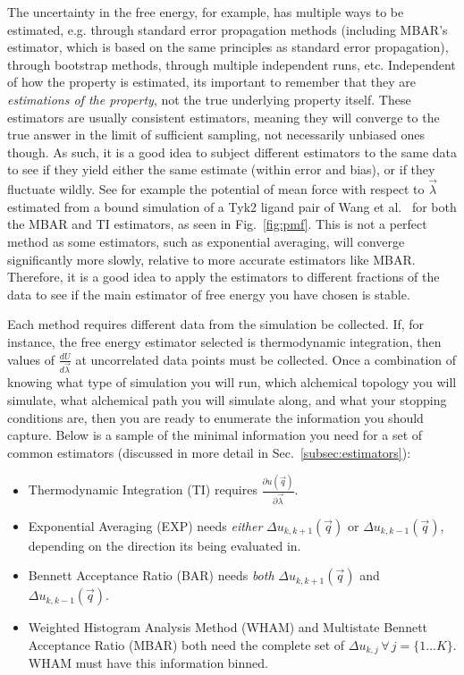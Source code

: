 \documentclass[9pt,bestpractices]{livecoms}
\begin{document}
The uncertainty in the free energy, for example, has multiple ways to be estimated, e.g. through standard error propagation methods (including MBAR's estimator, which is based on the same principles as standard error propagation), through bootstrap methods, through multiple independent runs, etc. 
Independent of how the property is estimated, its important to remember that they are \textit{estimations of the property}, not the true underlying property itself. 
These estimators are usually consistent estimators, meaning they will converge to the true answer in the limit of sufficient sampling, not necessarily unbiased ones though.
As such, it is a good idea to subject different estimators to the same data to see if they yield either the same estimate (within error and bias), or if they fluctuate wildly. See for example the potential of mean force with respect to $\vec{\lambda}$ estimated from a bound simulation of a Tyk2 ligand pair of Wang et al.~\cite{wang2015accurate} for both the MBAR and TI estimators, as seen in Fig.~\ref{fig:pmf}.
This is not a perfect method as some estimators, such as exponential averaging, will converge significantly more slowly, relative to more accurate estimators like MBAR. 
Therefore, it is a good idea to apply the estimators to different fractions of the data to see if the main estimator of free energy you have chosen is stable.

Each method requires different data from the simulation be collected. If, for instance, the free energy estimator selected is thermodynamic integration, then values of $\frac{dU}{d\vec{\lambda}}$ at uncorrelated data points must be collected. Once a combination of knowing what type of simulation you will run, which alchemical topology you will simulate, what alchemical path you will simulate along, and what your stopping conditions are, then you are ready to enumerate the information you should capture. Below is a sample of the minimal information you need for a set of common estimators (discussed in more detail in Sec.~\ref{subsec:estimators}):

\begin{itemize}
    \item Thermodynamic Integration (TI) requires $\frac{\partial u(\vec{q})}{\partial\vec{\lambda}}$.
    \item Exponential Averaging (EXP) needs \textit{either} $\Delta u_{k,k+1}(\vec{q})$ or $\Delta u_{k,k-1}(\vec{q})$, depending on the direction its being evaluated in.
    \item Bennett Acceptance Ratio (BAR) needs \textit{both} $\Delta u_{k,k+1}(\vec{q})$ and $\Delta u_{k,k-1}(\vec{q})$.
    \item Weighted Histogram Analysis Method (WHAM) and Multistate Bennett Acceptance Ratio (MBAR) both need the complete set of $\Delta u_{k,j} \, \forall \, j=\{1...K\}$. WHAM must have this information binned.
\end{itemize}
\end{document}
